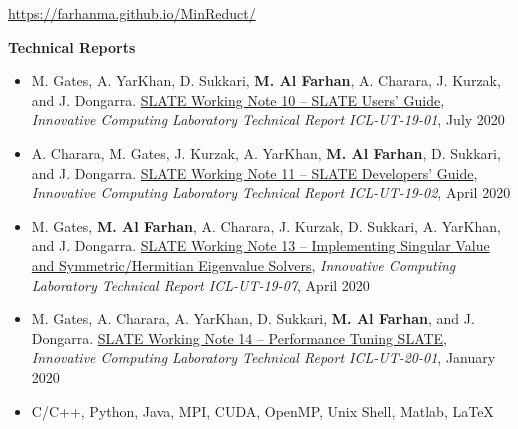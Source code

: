 \documentclass[9pt,a4paper]{extarticle}
\begin{document}
{\begin{itemize}
\url{https://farhanma.github.io/MinReduct/}\\
\end{itemize}

\textbf{Technical Reports}
\begin{itemize}
\item
M. Gates, A. YarKhan, D. Sukkari, \textbf{M. Al Farhan}, A. Charara, J. Kurzak, and J. Dongarra.
\href{http://www.icl.utk.edu/publications/swan-010}
{{SLATE Working Note 10 -- SLATE Users' Guide}},
\textit{Innovative Computing Laboratory Technical Report ICL-UT-19-01}, July 2020
\item
A. Charara, M. Gates, J. Kurzak, A. YarKhan,
\textbf{M. Al Farhan}, D. Sukkari, and J. Dongarra.
\href{http://www.icl.utk.edu/publications/swan-011}
{{SLATE Working Note 11 -- SLATE Developers' Guide}},
\textit{Innovative Computing Laboratory Technical Report ICL-UT-19-02}, April 2020
\item
M. Gates, \textbf{M. Al Farhan}, A. Charara, J. Kurzak, D. Sukkari, A. YarKhan, and J. Dongarra.
\href{http://www.icl.utk.edu/publications/swan-013}
{{SLATE Working Note 13 -- Implementing Singular Value and Symmetric/Hermitian Eigenvalue Solvers}},
\textit{Innovative Computing Laboratory Technical Report ICL-UT-19-07}, April 2020
\item
M. Gates, A. Charara, A. YarKhan, D. Sukkari,
\textbf{M. Al Farhan}, and J. Dongarra.
\href{http://www.icl.utk.edu/publications/swan-014}
{{SLATE Working Note 14 -- Performance Tuning SLATE}},
\textit{Innovative Computing Laboratory Technical Report ICL-UT-20-01}, January 2020
\end{itemize}
}
\bigskip
\bigskip

{
\begin{itemize}
\item
C/C++, Python, Java, MPI, CUDA, OpenMP, Unix Shell, Matlab, \LaTeX
\end{itemize}
}
\bigskip
\bigskip

\end{document}

